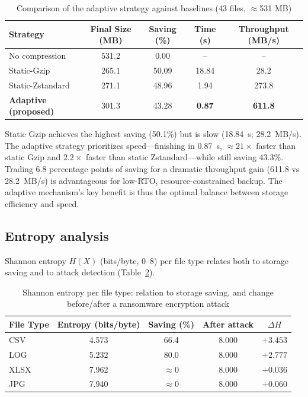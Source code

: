 \documentclass{iaesarticle}
\begin{document}
\begin{table}[htbp]
\centering
\fontsize{8pt}{10pt}\selectfont
\caption{Comparison of the adaptive strategy against baselines (43 files, $\approx$531 MB)}
\label{tab:baseline_comparison}
\begin{tabular}{l c c c c}
\hline
\textbf{Strategy} & \textbf{Final Size (MB)} & \textbf{Saving (\%)} & \textbf{Time (s)} & \textbf{Throughput (MB/s)} \\
\hline
No compression        & 531.2 & 0.00  & --    & -- \\
Static-Gzip           & 265.1 & 50.09 & 18.84 & 28.2 \\
Static-Zstandard      & 271.1 & 48.96 & 1.94  & 273.8 \\
\textbf{Adaptive (proposed)} & 301.3 & 43.28 & \textbf{0.87} & \textbf{611.8} \\
\hline
\end{tabular}
\end{table}

Static Gzip achieves the highest saving (50.1\%) but is slow (18.84~s; 28.2~MB/s). The adaptive strategy prioritizes speed---finishing in 0.87~s, $\approx21\times$ faster than static Gzip and $2.2\times$ faster than static Zstandard---while still saving 43.3\%. Trading 6.8 percentage points of saving for a dramatic throughput gain (611.8 vs 28.2~MB/s) is advantageous for low-RTO, resource-constrained backup. The adaptive mechanism's key benefit is thus the optimal balance between storage efficiency and speed.

\subsection{Entropy analysis}
Shannon entropy $H(X)$ (bits/byte, 0--8) per file type relates both to storage saving and to attack detection (Table~\ref{tab:entropy}).

\begin{table}[htbp]
\centering
\fontsize{8pt}{10pt}\selectfont
\caption{Shannon entropy per file type: relation to storage saving, and change before/after a ransomware encryption attack}
\label{tab:entropy}
\begin{tabular}{l c c c c}
\hline
\textbf{File Type} & \textbf{Entropy (bits/byte)} & \textbf{Saving (\%)} & \textbf{After attack} & \textbf{$\Delta H$} \\
\hline
CSV  & 4.573 & 66.4 & 8.000 & $+3.453$ \\
LOG  & 5.232 & 80.0 & 8.000 & $+2.777$ \\
XLSX & 7.962 & $\approx$0 & 8.000 & $+0.036$ \\
JPG  & 7.940 & $\approx$0 & 8.000 & $+0.060$ \\
\hline
\end{tabular}
\end{table}
\end{document}
